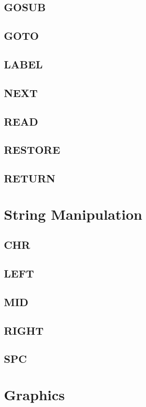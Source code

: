     \subsection{GOSUB}
    \subsection{GOTO}
    \subsection{LABEL}
    \subsection{NEXT}
    \subsection{READ}
    \subsection{RESTORE}
    \subsection{RETURN}

\section{String Manipulation}

    \subsection{CHR}
    \subsection{LEFT}
    \subsection{MID}
    \subsection{RIGHT}
    \subsection{SPC}

\section{Graphics}

